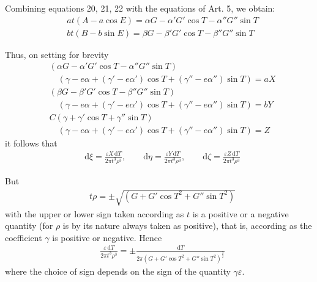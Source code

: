\begingroup
\renewcommand{\arraystretch}{1.45}

Combining equations 20, 21, 22 with the equations of Art. 5, we obtain:
\[
\begin{aligned}
&at(A-a\cos E)=\alpha G-\alpha'G'\cos T-\alpha''G''\sin T\\[8pt]
&bt(B-b\sin E)=\beta G-\beta'G'\cos T-\beta''G''\sin T
\end{aligned}
\]
\par Thus, on setting for brevity
\[
\begin{aligned}
&(\alpha G-\alpha'G'\cos T-\alpha''G''\sin T)\\[8pt]
&\quad(\gamma-e\alpha+(\gamma'-e\alpha')\cos T+(\gamma''-e\alpha'')\sin T)=aX\\[8pt]
&(\beta G-\beta'G'\cos T-\beta''G''\sin T)\\[8pt]
&\quad(\gamma-e\alpha+(\gamma'-e\alpha')\cos T+(\gamma''-e\alpha'')\sin T)=bY\\[8pt]
&C(\gamma+\gamma'\cos T+\gamma''\sin T)\\[8pt]
&\quad(\gamma-e\alpha+(\gamma'-e\alpha')\cos T+(\gamma''-e\alpha'')\sin T)=Z
\end{aligned}
\]
it follows that
\[
\begin{aligned}
&\mathrm d\xi=\frac{\varepsilon X\,\mathrm dT}{2\pi t^3\rho^3},\qquad
\mathrm d\eta=\frac{\varepsilon Y\,\mathrm dT}{2\pi t^3\rho^3},\qquad
\mathrm d\zeta=\frac{\varepsilon Z\,\mathrm dT}{2\pi t^3\rho^3}
\end{aligned}
\]
\par But
\[
\begin{aligned}
&t\rho=\pm\surd{(G+G'\cos T^2+G''\sin T^2)}
\end{aligned}
\]
with the upper or lower sign taken according as $t$ is a positive or a negative quantity (for $\rho$ is by its nature always taken as positive), that is, according as the coefficient $\gamma$ is positive or negative. Hence
\[
\begin{aligned}
&\frac{\varepsilon\,\mathrm dT}{2\pi t^3\rho^3}
=\pm\frac{\mathrm dT}{2\pi(G+G'\cos T^2+G''\sin T^2)^{\frac32}}
\end{aligned}
\]
where the choice of sign depends on the sign of the quantity $\gamma\varepsilon$.

